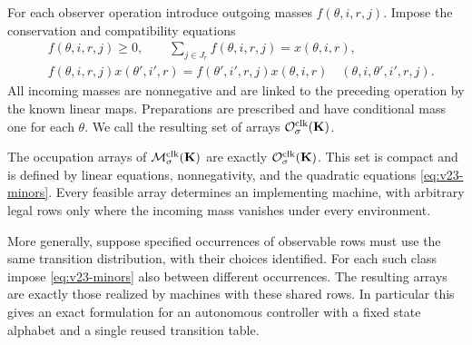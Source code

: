 For each observer operation introduce outgoing masses
$f(\theta,i,r,j)$. Impose the conservation and compatibility equations
\begin{align}
 &f(\theta,i,r,j)\ge0,\qquad
   \sum_{j\in J_r}f(\theta,i,r,j)=x(\theta,i,r),
                                      \label{eq:v23-conservation}\\
 &f(\theta,i,r,j)x(\theta',i',r)
  =f(\theta',i',r,j)x(\theta,i,r)
       \quad(\theta,i,\theta',i',r,j). \label{eq:v23-minors}
\end{align}
All incoming masses are nonnegative and are linked to the preceding
operation by the known linear maps. Preparations are prescribed and
have conditional mass one for each $\theta$. We call the resulting
set of arrays $\mathcal O^{\rm clk}_\sigma(\mathbf K)$.

\begin{theorem}
\label{thm:v23-occupation}
The occupation arrays of
$\mathcal M^{\rm clk}_\sigma(\mathbf K)$ are exactly
$\mathcal O^{\rm clk}_\sigma(\mathbf K)$. This set is compact and is
defined by linear equations, nonnegativity, and the quadratic equations
\eqref{eq:v23-minors}. Every feasible array determines an implementing
machine, with arbitrary legal rows only where the incoming mass vanishes
under every environment.

More generally, suppose specified occurrences of observable rows must
use the same transition distribution, with their choices identified.
For each such class impose \eqref{eq:v23-minors} also between different
occurrences. The resulting arrays are exactly those realized by machines
with these shared rows. In particular this gives an exact formulation
for an autonomous controller with a fixed state alphabet and a single
reused transition table.
\end{theorem}
